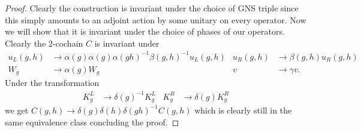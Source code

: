 \documentclass[12pt,a4paper,twoside]{article}
\numberwithin{equation}{section}
\begin{document}
\begin{proof}
	Clearly the construction is invariant under the choice of GNS triple since this simply amounts to an adjoint action by some unitary on every operator. Now we will show that it is invariant under the choice of phases of our operators. Clearly the 2-cochain $C$ is invariant under
	\begin{align}
		u_L(g,h)&\rightarrow \alpha(g)\alpha(g)\alpha(gh)^{-1}\beta(g,h)^{-1} u_L(g,h)&u_R(g,h)&\rightarrow \beta(g,h)u_R(g,h)\\
		W_g&\rightarrow\alpha(g)W_g&v&\rightarrow \gamma v.
	\end{align}
	Under the transformation
	\begin{align}
		K_g^L&\rightarrow \delta(g)^{-1}K_g^L&K_g^R&\rightarrow \delta(g)K_g^R
	\end{align}
	we get $C(g,h)\rightarrow \delta(g)\delta(h)\delta(gh)^{-1}C(g,h)$ which is clearly still in the same equivalence class concluding the proof.
\end{proof}
\end{document}
